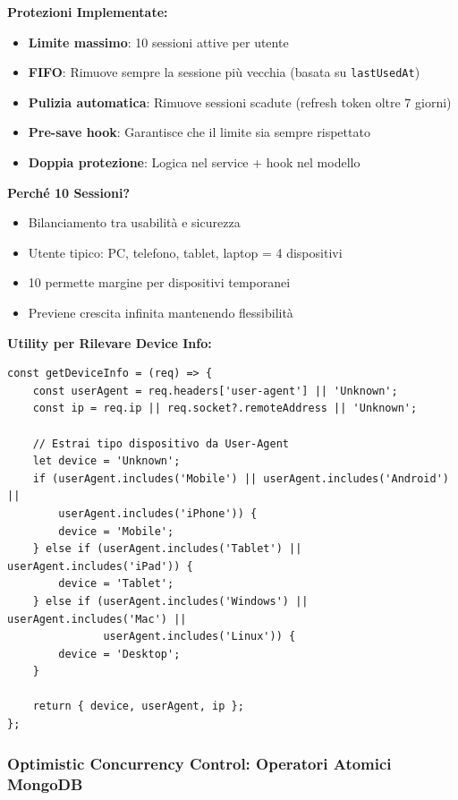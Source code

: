 \documentclass[11pt,a4paper]{article}
\newcommand{\code}[1]{\texttt{#1}}
\begin{document}
\textbf{Protezioni Implementate:}
\begin{itemize}
    \item \textbf{Limite massimo}: 10 sessioni attive per utente
    \item \textbf{FIFO}: Rimuove sempre la sessione più vecchia (basata su \code{lastUsedAt})
    \item \textbf{Pulizia automatica}: Rimuove sessioni scadute (refresh token oltre 7 giorni)
    \item \textbf{Pre-save hook}: Garantisce che il limite sia sempre rispettato
    \item \textbf{Doppia protezione}: Logica nel service + hook nel modello
\end{itemize}

\textbf{Perché 10 Sessioni?}
\begin{itemize}
    \item Bilanciamento tra usabilità e sicurezza
    \item Utente tipico: PC, telefono, tablet, laptop = 4 dispositivi
    \item 10 permette margine per dispositivi temporanei
    \item Previene crescita infinita mantenendo flessibilità
\end{itemize}

\textbf{Utility per Rilevare Device Info:}

\begin{lstlisting}[caption=Utility getDeviceInfo]
const getDeviceInfo = (req) => {
    const userAgent = req.headers['user-agent'] || 'Unknown';
    const ip = req.ip || req.socket?.remoteAddress || 'Unknown';
    
    // Estrai tipo dispositivo da User-Agent
    let device = 'Unknown';
    if (userAgent.includes('Mobile') || userAgent.includes('Android') || 
        userAgent.includes('iPhone')) {
        device = 'Mobile';
    } else if (userAgent.includes('Tablet') || userAgent.includes('iPad')) {
        device = 'Tablet';
    } else if (userAgent.includes('Windows') || userAgent.includes('Mac') || 
               userAgent.includes('Linux')) {
        device = 'Desktop';
    }
    
    return { device, userAgent, ip };
};
\end{lstlisting}

\subsubsection{Optimistic Concurrency Control: Operatori Atomici MongoDB}
\end{document}
